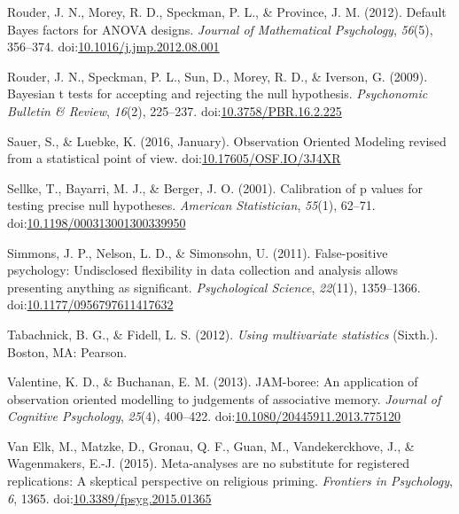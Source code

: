 \documentclass[english,man]{apa6}
\theoremstyle{definition}
\theoremstyle{definition}
\theoremstyle{definition}
\theoremstyle{remark}
\begin{document}
\hypertarget{ref-Rouder2012}{}
Rouder, J. N., Morey, R. D., Speckman, P. L., \& Province, J. M. (2012).
Default Bayes factors for ANOVA designs. \emph{Journal of Mathematical
Psychology}, \emph{56}(5), 356--374.
doi:\href{https://doi.org/10.1016/j.jmp.2012.08.001}{10.1016/j.jmp.2012.08.001}

\hypertarget{ref-Rouder2009}{}
Rouder, J. N., Speckman, P. L., Sun, D., Morey, R. D., \& Iverson, G.
(2009). Bayesian t tests for accepting and rejecting the null
hypothesis. \emph{Psychonomic Bulletin \& Review}, \emph{16}(2),
225--237.
doi:\href{https://doi.org/10.3758/PBR.16.2.225}{10.3758/PBR.16.2.225}

\hypertarget{ref-Sauer2016}{}
Sauer, S., \& Luebke, K. (2016, January). Observation Oriented Modeling
revised from a statistical point of view.
doi:\href{https://doi.org/10.17605/OSF.IO/3J4XR}{10.17605/OSF.IO/3J4XR}

\hypertarget{ref-Sellke2001}{}
Sellke, T., Bayarri, M. J., \& Berger, J. O. (2001). Calibration of p
values for testing precise null hypotheses. \emph{American
Statistician}, \emph{55}(1), 62--71.
doi:\href{https://doi.org/10.1198/000313001300339950}{10.1198/000313001300339950}

\hypertarget{ref-Simmons2011}{}
Simmons, J. P., Nelson, L. D., \& Simonsohn, U. (2011). False-positive
psychology: Undisclosed flexibility in data collection and analysis
allows presenting anything as significant. \emph{Psychological Science},
\emph{22}(11), 1359--1366.
doi:\href{https://doi.org/10.1177/0956797611417632}{10.1177/0956797611417632}

\hypertarget{ref-Tabachnick2012}{}
Tabachnick, B. G., \& Fidell, L. S. (2012). \emph{Using multivariate
statistics} (Sixth.). Boston, MA: Pearson.

\hypertarget{ref-Valentine2013}{}
Valentine, K. D., \& Buchanan, E. M. (2013). JAM-boree: An application
of observation oriented modelling to judgements of associative memory.
\emph{Journal of Cognitive Psychology}, \emph{25}(4), 400--422.
doi:\href{https://doi.org/10.1080/20445911.2013.775120}{10.1080/20445911.2013.775120}

\hypertarget{ref-VanElk2015}{}
Van Elk, M., Matzke, D., Gronau, Q. F., Guan, M., Vandekerckhove, J., \&
Wagenmakers, E.-J. (2015). Meta-analyses are no substitute for
registered replications: A skeptical perspective on religious priming.
\emph{Frontiers in Psychology}, \emph{6}, 1365.
doi:\href{https://doi.org/10.3389/fpsyg.2015.01365}{10.3389/fpsyg.2015.01365}
\end{document}

